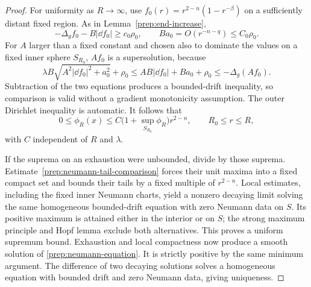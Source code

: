 \begin{proof}
For uniformity as $R\to\infty$, use
$f_0(r)=r^{2-n}(1-r^{-\beta})$ on a sufficiently distant fixed region.
As in Lemma~\ref{prep:end-increase},
\[
 -\Delta_g f_0-B|\dd f_0|\geq c_0\rho_0,
 \qquad Ba_0=O(r^{-n-q})\leq C_0\rho_0.
\]
For $A$ larger than a fixed constant and chosen also to dominate the
values on a fixed inner sphere $S_{R_0}$, $Af_0$ is a supersolution,
because
\[
 \lambda B\sqrt{A^2|\dd f_0|^2+a_0^2}+\rho_0
 \leq AB|\dd f_0|+Ba_0+\rho_0
 \leq-\Delta_g(Af_0).
\]
Subtraction of the two equations produces a bounded-drift inequality,
so comparison is valid without a gradient monotonicity assumption.
The outer Dirichlet inequality is automatic.  It follows that
\begin{equation}
 \label{prep:neumann-tail-comparison}
 0\leq\phi_R(x)
 \leq C\bigl(1+\sup_{S_{R_0}}\phi_R\bigr)r^{2-n},
 \qquad R_0\leq r\leq R,
\end{equation}
with $C$ independent of $R$ and $\lambda$.

If the suprema on an exhaustion were unbounded, divide by those
suprema.  Estimate~\eqref{prep:neumann-tail-comparison} forces their
unit maxima into a fixed compact set and bounds their tails by a fixed
multiple of $r^{2-n}$.  Local estimates, including the fixed inner
Neumann charts, yield a nonzero decaying limit solving the same
homogeneous bounded-drift equation with zero Neumann data on $S$.
Its positive maximum is attained either in the interior or on $S$;
the strong maximum principle and Hopf lemma exclude both alternatives.
This proves a uniform supremum bound.  Exhaustion and local compactness
now produce a smooth solution of \eqref{prep:neumann-equation}.
It is strictly positive by the same minimum argument.  The difference
of two decaying solutions solves a homogeneous equation with bounded
drift and zero Neumann data, giving uniqueness.


\end{proof}
